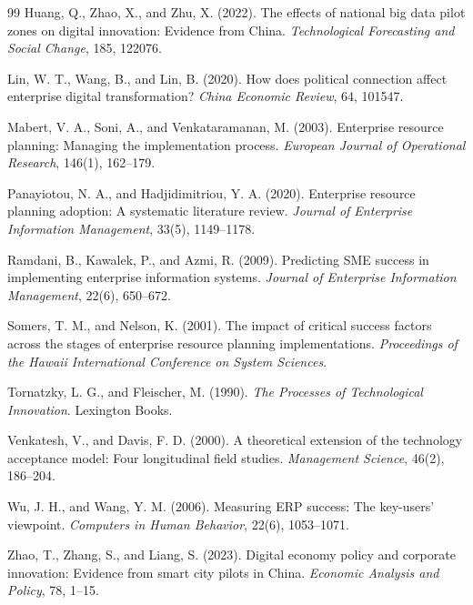 \documentclass[12pt]{article}
\begin{document}
\begin{thebibliography}{99}
Huang, Q., Zhao, X., and Zhu, X. (2022). The effects of national big data pilot zones on digital innovation: Evidence from China. \textit{Technological Forecasting and Social Change}, 185, 122076.

Lin, W. T., Wang, B., and Lin, B. (2020). How does political connection affect enterprise digital transformation? \textit{China Economic Review}, 64, 101547.

Mabert, V. A., Soni, A., and Venkataramanan, M. (2003). Enterprise resource planning: Managing the implementation process. \textit{European Journal of Operational Research}, 146(1), 162--179.

Panayiotou, N. A., and Hadjidimitriou, Y. A. (2020). Enterprise resource planning adoption: A systematic literature review. \textit{Journal of Enterprise Information Management}, 33(5), 1149--1178.

Ramdani, B., Kawalek, P., and Azmi, R. (2009). Predicting SME success in implementing enterprise information systems. \textit{Journal of Enterprise Information Management}, 22(6), 650--672.

Somers, T. M., and Nelson, K. (2001). The impact of critical success factors across the stages of enterprise resource planning implementations. \textit{Proceedings of the Hawaii International Conference on System Sciences}.

Tornatzky, L. G., and Fleischer, M. (1990). \textit{The Processes of Technological Innovation}. Lexington Books.

Venkatesh, V., and Davis, F. D. (2000). A theoretical extension of the technology acceptance model: Four longitudinal field studies. \textit{Management Science}, 46(2), 186--204.

Wu, J. H., and Wang, Y. M. (2006). Measuring ERP success: The key-users' viewpoint. \textit{Computers in Human Behavior}, 22(6), 1053--1071.

Zhao, T., Zhang, S., and Liang, S. (2023). Digital economy policy and corporate innovation: Evidence from smart city pilots in China. \textit{Economic Analysis and Policy}, 78, 1--15.

\end{thebibliography}
\end{document}
